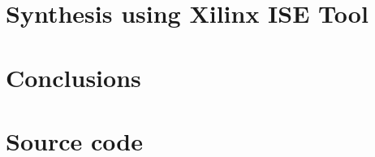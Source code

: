 \documentclass[12pt,a4paper]{report}
\begin{document}
\chapter{Synthesis using Xilinx ISE Tool}




\chapter{Conclusions}




\appendix

\chapter{Source code}
\end{document}
